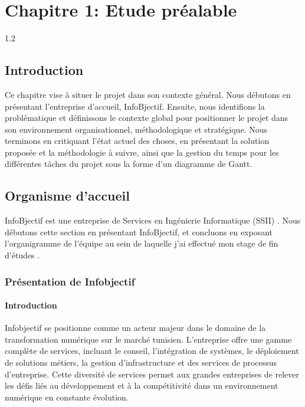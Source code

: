 \chapter{Chapitre 1: Etude préalable}
\begin{spacing}{1.2}
\minitoc
\thispagestyle{MyStyle}
\end{spacing}
\newpage
\renewcommand{\tablename}{Tableau}
\begin{sloppypar} 

\section{Introduction }
\vspace{-4mm}
Ce chapitre vise à situer le projet dans son contexte général. Nous débutons en présentant l'entreprise d'accueil, InfoBjectif. Ensuite, nous identifions la problématique et définissons le contexte global pour positionner le projet dans son environnement organisationnel, méthodologique et stratégique. Nous terminons en critiquant l'état actuel des choses, en présentant la solution proposée et la méthodologie à suivre, ainsi que la gestion du temps pour les différentes tâches du projet sous la forme d'un diagramme de Gantt. 
\vspace{-6mm}
\section{Organisme d’accueil  }
\vspace{-4mm}
InfoBjectif est une entreprise de Services en Ingénierie Informatique (SSII) . Nous débutons cette section en présentant InfoBjectif, et concluons en exposant l'organigramme de l'équipe au sein de laquelle j’ai effectué mon stage de fin d'études .
\vspace{-6mm}
\subsection{Présentation de Infobjectif}
\vspace{-4mm}
\subsubsection{Introduction}
\vspace{-4mm}
Infobjectif se positionne comme un acteur majeur dans le domaine de la transformation numérique sur le marché tunisien. L'entreprise offre une gamme complète de services, incluant le conseil, l'intégration de systèmes, le déploiement de solutions métiers, la gestion d'infrastructure et des services de processus d'entreprise. Cette diversité de services permet aux grandes entreprises de relever les défis liés au développement et à la compétitivité dans un environnement numérique en constante évolution.


\end{sloppypar}

